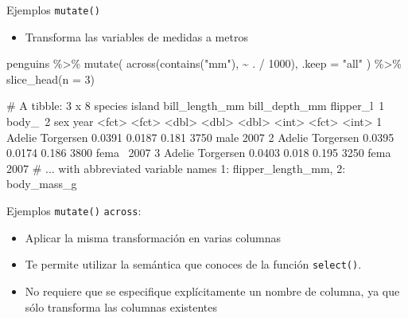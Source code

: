 \documentclass[
  ignorenonframetext,
  aspectratio=169]{beamer}
\newenvironment{Shaded}{\begin{snugshade}}{\end{snugshade}}
\newcommand{\AttributeTok}[1]{\textcolor[rgb]{0.77,0.63,0.00}{#1}}
\newcommand{\DecValTok}[1]{\textcolor[rgb]{0.00,0.00,0.81}{#1}}
\newcommand{\FunctionTok}[1]{\textcolor[rgb]{0.00,0.00,0.00}{#1}}
\newcommand{\NormalTok}[1]{#1}
\newcommand{\SpecialCharTok}[1]{\textcolor[rgb]{0.00,0.00,0.00}{#1}}
\newcommand{\StringTok}[1]{\textcolor[rgb]{0.31,0.60,0.02}{#1}}
\providecommand{\tightlist}{%
  \setlength{\itemsep}{0pt}\setlength{\parskip}{0pt}}
\let\oldverbatim\verbatim
\let\endoldverbatim\endverbatim
\renewenvironment{verbatim}{\tiny\oldverbatim}{\endoldverbatim}
\begin{document}
\begin{frame}[fragile]{Ejemplos \texttt{mutate()}}
\protect\hypertarget{ejemplos-mutate-3}{}
\begin{itemize}
\tightlist
\item
  Transforma las variables de medidas a metros
\end{itemize}

\begin{Shaded}
\begin{Highlighting}[]
\NormalTok{penguins }\SpecialCharTok{\%\textgreater{}\%} 
  \FunctionTok{mutate}\NormalTok{(}
    \FunctionTok{across}\NormalTok{(}\FunctionTok{contains}\NormalTok{(}\StringTok{"mm"}\NormalTok{), }\SpecialCharTok{\textasciitilde{}}\NormalTok{ . }\SpecialCharTok{/} \DecValTok{1000}\NormalTok{),}
    \AttributeTok{.keep =} \StringTok{"all"}
\NormalTok{  ) }\SpecialCharTok{\%\textgreater{}\%} 
  \FunctionTok{slice\_head}\NormalTok{(}\AttributeTok{n =} \DecValTok{3}\NormalTok{)}
\end{Highlighting}
\end{Shaded}

\begin{verbatim}
# A tibble: 3 x 8
  species island    bill_length_mm bill_depth_mm flipper_l~1 body_~2 sex    year
  <fct>   <fct>              <dbl>         <dbl>       <dbl>   <int> <fct> <int>
1 Adelie  Torgersen         0.0391        0.0187       0.181    3750 male   2007
2 Adelie  Torgersen         0.0395        0.0174       0.186    3800 fema~  2007
3 Adelie  Torgersen         0.0403        0.018        0.195    3250 fema~  2007
# ... with abbreviated variable names 1: flipper_length_mm, 2: body_mass_g
\end{verbatim}
\end{frame}

\begin{frame}[fragile]{Ejemplos \texttt{mutate()}}
\protect\hypertarget{ejemplos-mutate-4}{}
\texttt{across}:

\begin{itemize}
\item
  Aplicar la misma transformación en varias columnas
\item
  Te permite utilizar la semántica que conoces de la función
  \texttt{select()}.
\item
  No requiere que se especifique explícitamente un nombre de columna, ya
  que sólo transforma las columnas existentes
\end{itemize}
\end{frame}
\end{document}
